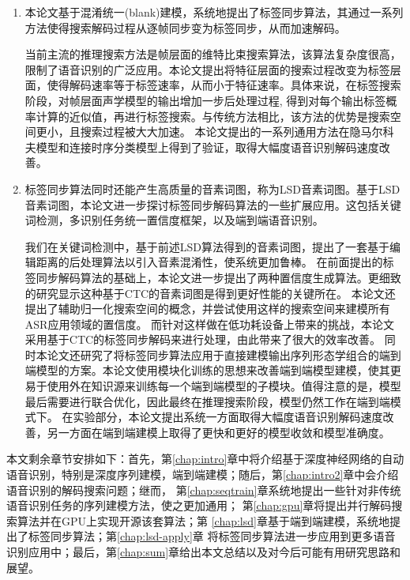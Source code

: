 \begin{enumerate}
\item 本论文基于混淆统一(blank)建模，系统地提出了标签同步算法，其通过一系列方法使得搜索解码过程从逐帧同步变为标签同步，从而加速解码。

当前主流的推理搜索方法是帧层面的维特比束搜索算法，该算法复杂度很高，限制了语音识别的广泛应用。本论文提出将特征层面的搜索过程改变为标签层面，使得解码速率等于标签速率，从而小于特征速率。具体来说，在标签搜索阶段，对帧层面声学模型的输出增加一步后处理过程, 得到对每个输出标签概率计算的近似值，再进行标签搜索。与传统方法相比，该方法的优势是搜索空间更小，且搜索过程被大大加速。
本论文提出的一系列通用方法在隐马尔科夫模型和连接时序分类模型上得到了验证，取得大幅度语音识别解码速度改善。

\item 标签同步算法同时还能产生高质量的音素词图，称为LSD音素词图。基于LSD音素词图，本论文进一步探讨标签同步解码算法的一些扩展应用。这包括关键词检测，多识别任务统一置信度框架，以及端到端语音识别。

我们在关键词检测中，基于前述LSD算法得到的音素词图，提出了一套基于编辑距离的后处理算法以引入音素混淆性，使系统更加鲁棒。
%
在前面提出的标签同步解码算法的基础上，本论文进一步提出了两种置信度生成算法。更细致的研究显示这种基于CTC的音素词图是得到更好性能的关键所在。
%
本论文还提出了辅助归一化搜索空间的概念，并尝试使用这样的搜索空间来建模所有ASR应用领域的置信度。 %
而针对这样做在低功耗设备上带来的挑战，本论文采用基于CTC的标签同步解码来进行处理，由此带来了很大的效率改善。
%
同时本论文还研究了将标签同步算法应用于直接建模输出序列形态学组合的端到端模型的方案。本论文使用模块化训练的思想来改善端到端模型建模，使其更易于使用外在知识源来训练每一个端到端模型的子模块。值得注意的是，模型最后需要进行联合优化，因此最终在推理搜索阶段，模型仍然工作在端到端模式下。
在实验部分，本论文提出系统一方面取得大幅度语音识别解码速度改善，另一方面在端到端建模上取得了更快和更好的模型收敛和模型准确度。

\end{enumerate}

本文剩余章节安排如下：首先，第\ref{chap:intro}章中将介绍基于深度神经网络的自动语音识别，特别是深度序列建模，端到端建模；随后，第\ref{chap:intro2}章中会介绍语音识别的解码搜索问题；继而，
第\ref{chap:seqtrain}章系统地提出一些针对非传统语音识别任务的序列建模方法，使之更加通用；
第\ref{chap:gpu}章将提出并行解码搜索算法并在GPU上实现开源该套算法；第
\ref{chap:lsd}章基于端到端建模，系统地提出了标签同步算法；第\ref{chap:lsd-apply}章
将标签同步算法进一步应用到更多语音识别应用中；最后，第\ref{chap:sum}章给出本文总结以及对今后可能有用研究思路和展望。
